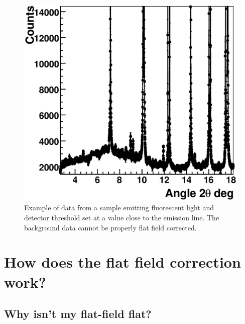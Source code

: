 \begin{figure}
\begin{center}
\includegraphics[width=\textwidth]{images/sample_with_fluorescence}
\end{center}
\caption{Example of data from a sample emitting fluorescent light and detector threshold set at a value close to the emission line. The background data cannot be properly flat field corrected.}\label{fig:samplefluo}
\end{figure}

\section{How does the flat field correction work?}



\subsection{Why isn't my flat-field flat?}

